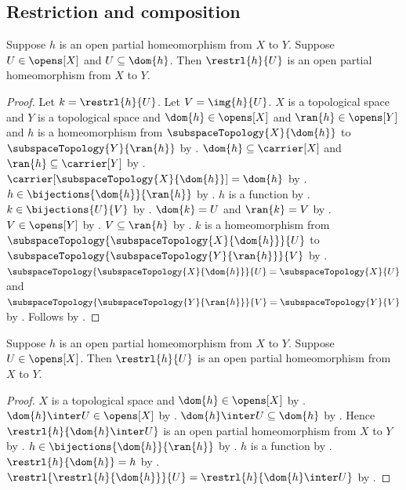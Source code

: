\subsection{Restriction and composition}

\begin{theorem}\label{open_partial_homeomorphism_restriction_on_subset}
    Suppose $h$ is an open partial homeomorphism from $X$ to $Y$.
    Suppose $U\in\opens[X]$ and $U\subseteq\dom{h}$.
    Then $\restrl{h}{U}$ is an open partial homeomorphism from $X$ to $Y$.
\end{theorem}
\begin{proof}
    Let $k=\restrl{h}{U}$.
    Let $V=\img{h}{U}$.
    $X$ is a topological space and $Y$ is a topological space and
        $\dom{h}\in\opens[X]$ and $\ran{h}\in\opens[Y]$ and
        $h$ is a homeomorphism from $\subspaceTopology{X}{\dom{h}}$
            to $\subspaceTopology{Y}{\ran{h}}$ by
        .
    $\dom{h}\subseteq\carrier[X]$ and $\ran{h}\subseteq\carrier[Y]$ by
        .
    $\carrier[\subspaceTopology{X}{\dom{h}}]=\dom{h}$ by
        .
    $h\in\bijections{\dom{h}}{\ran{h}}$ by
        .
    $h$ is a function by .
    $k\in\bijections{U}{V}$ by .
    $\dom{k}=U$ and $\ran{k}=V$ by
        .
    $V\in\opens[Y]$ by .
    $V\subseteq\ran{h}$ by .
    $k$ is a homeomorphism from
        $\subspaceTopology{\subspaceTopology{X}{\dom{h}}}{U}$ to
        $\subspaceTopology{\subspaceTopology{Y}{\ran{h}}}{V}$ by
        .
    $\subspaceTopology{\subspaceTopology{X}{\dom{h}}}{U}
        =\subspaceTopology{X}{U}$ and
        $\subspaceTopology{\subspaceTopology{Y}{\ran{h}}}{V}
        =\subspaceTopology{Y}{V}$ by .
    Follows by .
\end{proof}

\begin{theorem}\label{open_partial_homeomorphism_restriction}
    Suppose $h$ is an open partial homeomorphism from $X$ to $Y$.
    Suppose $U\in\opens[X]$.
    Then $\restrl{h}{U}$ is an open partial homeomorphism from $X$ to $Y$.
\end{theorem}
\begin{proof}
    $X$ is a topological space and $\dom{h}\in\opens[X]$ by
        .
    $\dom{h}\inter U\in\opens[X]$ by .
    $\dom{h}\inter U\subseteq\dom{h}$ by .
    Hence $\restrl{h}{\dom{h}\inter U}$ is an open partial homeomorphism
        from $X$ to $Y$ by
        .
    $h\in\bijections{\dom{h}}{\ran{h}}$ by
        .
    $h$ is a function by .
    $\restrl{h}{\dom{h}}=h$ by .
    $\restrl{\restrl{h}{\dom{h}}}{U}
        =\restrl{h}{\dom{h}\inter U}$ by .
\end{proof}

